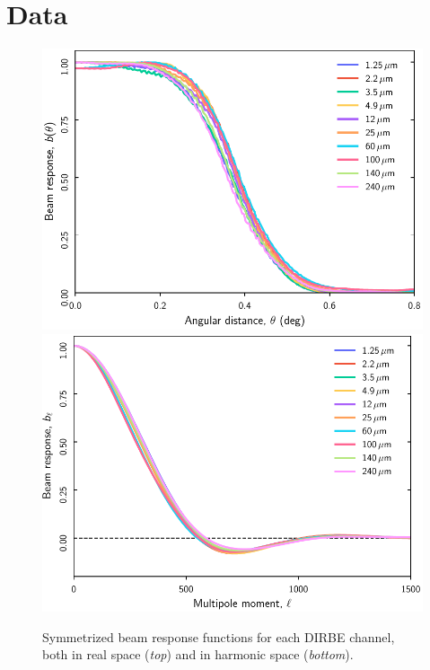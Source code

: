 \documentclass{aa}
\begin{document}
\section{Data}
\label{sec:data}



\begin{figure}
  \centering
  \includegraphics[width=\linewidth]{figs/DIRBE_beam_theta.pdf}\\
  \includegraphics[width=\linewidth]{figs/DIRBE_beam_ell.pdf}
  \caption{Symmetrized beam response functions for each DIRBE channel, both in real space (\emph{top}) and in harmonic space (\emph{bottom}).}
  \label{fig:beams}
\end{figure}
\end{document}

